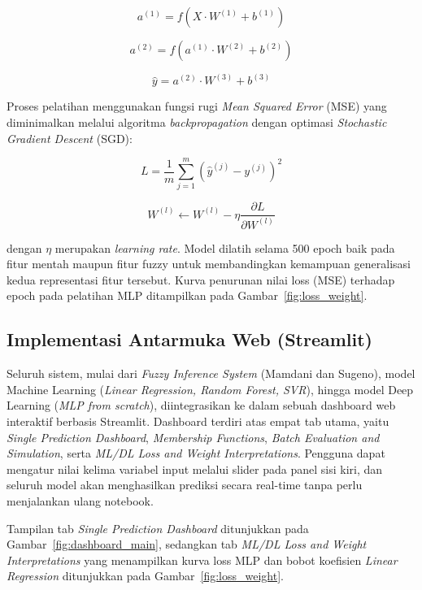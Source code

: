\documentclass[11pt,a4paper]{article}
\begin{document}
\begin{equation}
a^{(1)} = f(X \cdot W^{(1)} + b^{(1)})
\end{equation}

\begin{equation}
a^{(2)} = f(a^{(1)} \cdot W^{(2)} + b^{(2)})
\end{equation}

\begin{equation}
\hat{y} = a^{(2)} \cdot W^{(3)} + b^{(3)}
\end{equation}

Proses pelatihan menggunakan fungsi rugi \textit{Mean Squared Error} (MSE) yang diminimalkan melalui algoritma \textit{backpropagation} dengan optimasi \textit{Stochastic Gradient Descent} (SGD):

\begin{equation}
L = \frac{1}{m} \sum_{j=1}^{m} (\hat{y}^{(j)} - y^{(j)})^2
\end{equation}

\begin{equation}
W^{(l)} \leftarrow W^{(l)} - \eta \frac{\partial L}{\partial W^{(l)}}
\end{equation}

\noindent dengan $\eta$ merupakan \textit{learning rate}. Model dilatih selama 500 epoch baik pada fitur mentah maupun fitur fuzzy untuk membandingkan kemampuan generalisasi kedua representasi fitur tersebut. Kurva penurunan nilai loss (MSE) terhadap epoch pada pelatihan MLP ditampilkan pada Gambar~\ref{fig:loss_weight}.

\subsection{Implementasi Antarmuka Web (Streamlit)}
Seluruh sistem, mulai dari \textit{Fuzzy Inference System} (Mamdani dan Sugeno), model Machine Learning (\textit{Linear Regression, Random Forest, SVR}), hingga model Deep Learning (\textit{MLP from scratch}), diintegrasikan ke dalam sebuah dashboard web interaktif berbasis Streamlit. Dashboard terdiri atas empat tab utama, yaitu \textit{Single Prediction Dashboard}, \textit{Membership Functions}, \textit{Batch Evaluation and Simulation}, serta \textit{ML/DL Loss and Weight Interpretations}. Pengguna dapat mengatur nilai kelima variabel input melalui slider pada panel sisi kiri, dan seluruh model akan menghasilkan prediksi secara real-time tanpa perlu menjalankan ulang notebook. 

Tampilan tab \textit{Single Prediction Dashboard} ditunjukkan pada Gambar~\ref{fig:dashboard_main}, sedangkan tab \textit{ML/DL Loss and Weight Interpretations} yang menampilkan kurva loss MLP dan bobot koefisien \textit{Linear Regression} ditunjukkan pada Gambar~\ref{fig:loss_weight}.
\end{document}
